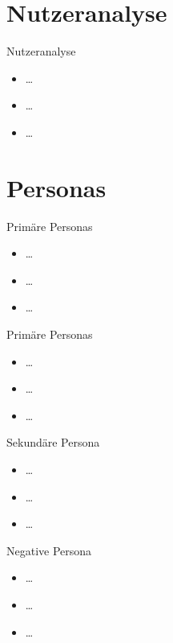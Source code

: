 \documentclass[presentation,bigger,aspectratio=169]{beamer}
\begin{document}
\section{Nutzeranalyse}
\label{sec:orgd70bb3a}
\begin{frame}[label={sec:org03f2df1}]{\MakeUppercase{\insertsection}}
\end{frame}
\begin{frame}[label={sec:org4837cfb}]{Nutzeranalyse}
\begin{itemize}
\item \ldots{}
\item \ldots{}
\item \ldots{}
\end{itemize}
\end{frame}
\section{Personas}
\label{sec:orga241f23}
\begin{frame}[label={sec:org58152b5}]{\MakeUppercase{\insertsection}}
\end{frame}
\begin{frame}[label={sec:org23edfac}]{Primäre Personas}
\begin{itemize}
\item \ldots{}
\item \ldots{}
\item \ldots{}
\end{itemize}
\end{frame}
\begin{frame}[label={sec:orgc742ca6}]{Primäre Personas}
\begin{itemize}
\item \ldots{}
\item \ldots{}
\item \ldots{}
\end{itemize}
\end{frame}
\begin{frame}[label={sec:org428bee9}]{Sekundäre Persona}
\begin{itemize}
\item \ldots{}
\item \ldots{}
\item \ldots{}
\end{itemize}
\end{frame}
\begin{frame}[label={sec:org77634d6}]{Negative Persona}
\begin{itemize}
\item \ldots{}
\item \ldots{}
\item \ldots{}
\end{itemize}
\end{frame}
\end{document}
